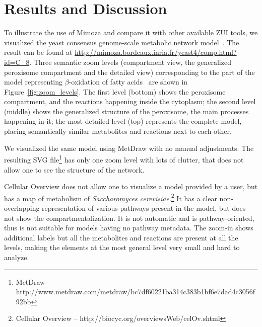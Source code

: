 \documentclass{bmcart}
\begin{document}
\section*{Results and Discussion}
To illustrate the use of Mimoza and compare it with other available ZUI tools, we visualized the yeast consensus genome-scale metabolic network model~\cite{Herrgard2008}. The result can be found at \url{http://mimoza.bordeaux.inria.fr/yeast4/comp.html?id=C_8}. 
Three semantic zoom levels (compartment view, the generalized peroxisome compartment and the detailed view) corresponding to the part of the model representing $\beta$-oxidation of fatty acids~\cite{Metzler01} are shown in Figure~\ref{fig:zoom_levels}. The first level (bottom) shows the peroxisome compartment, and the reactions happening inside the cytoplasm; the second level (middle) shows the generalized structure of the peroxisome, the main processes happening in it; the most detailed level (top) represents the complete model, placing semantically similar metabolites and reactions next to each other.

We visualized the same model using MetDraw with no manual adjustments. The resulting SVG file\footnote{MetDraw -- http://www.metdraw.com/metdraw/bc7df60221ba314c383b1bf6e7dad4c3056f92bb} has only one zoom level with lots of clutter, that does not allow one to see the structure of the network.

Cellular Overview does not allow one to visualize a model provided by a user, but has a map of metabolism of \emph{Saccharomyces cerevisiae}.\footnote{Cellular Overview -- http://biocyc.org/overviewsWeb/celOv.shtml} It has a clear non-overlapping representation of various pathways present in the model, but does not show the compartmentalization. It is not automatic and is pathway-oriented, thus is not suitable for models having no pathway metadata. The zoom-in shows additional labels but all the metabolites and reactions are present at all the levels, making the elements at the most general level very small and hard to analyze.
\end{document}
